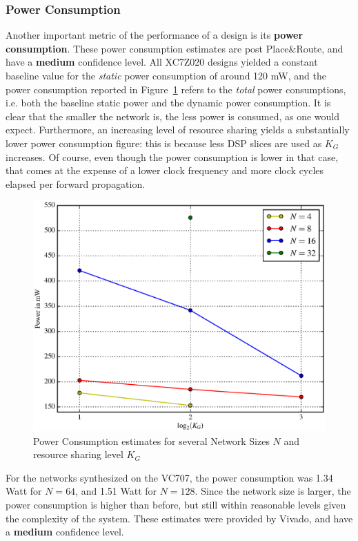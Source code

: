 \documentclass[conference]{IEEEtran}
\begin{document}
\subsubsection{Power Consumption}\label{sec:res-synth-power}
Another important metric of the performance of a design is its \textbf{power consumption}. These power consumption estimates are post Place\&Route, and
have a \textbf{medium} confidence level. All  XC7Z020 designs yielded a constant baseline value for the \emph{static} power consumption of around 120 mW,
and the power consumption reported
in Figure~\ref{fig:power} refers to the \emph{total} power consumptions, i.e. both the baseline static power and the dynamic power consumption.
It is clear that the smaller the network is, the less power is consumed, as one would expect. Furthermore, an increasing
level of resource sharing yields a substantially lower power consumption figure: this is because less DSP slices are used as $K_G$ increases.
Of course, even though the power consumption is lower in that case, that comes at the expense of a lower clock frequency and more clock cycles
elapsed per forward propagation.

\begin{figure}
    \centering
    \includegraphics[width=\linewidth]{figures/power.eps}
    \caption{Power Consumption estimates for several Network Sizes $N$ and resource sharing level $K_G$}
    \label{fig:power}
\end{figure}

For the networks synthesized on the VC707, the power consumption was 1.34 Watt for $N=64$, and 1.51 Watt for $N=128$. Since the network size is larger, the power consumption is higher than before, but still within reasonable levels given the complexity of the system. These estimates were provided by Vivado, and have a \textbf{medium} confidence level.
\end{document}
